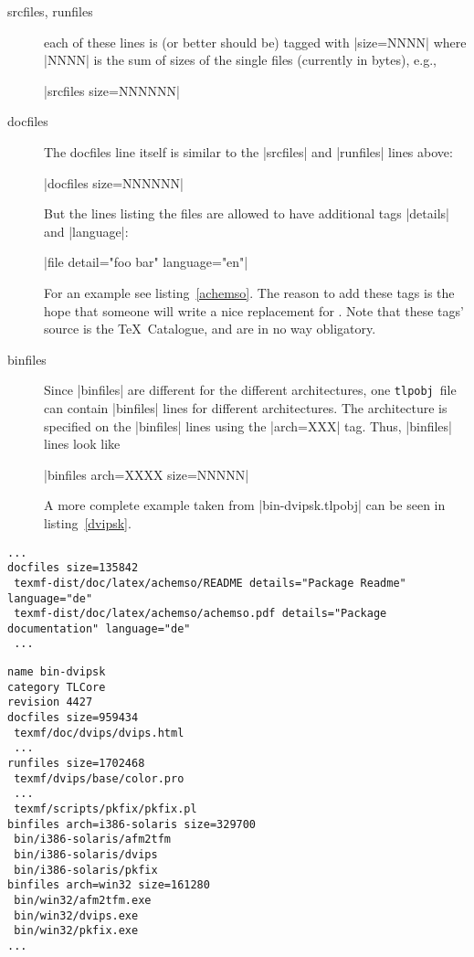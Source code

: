 \documentclass{arstexnica}
\newcommand{\tlpobj}{\texttt{tlpobj}}
\begin{document}
\begin{article}
\begin{description}
\item[srcfiles, runfiles] each of these lines is (or better should be)
  tagged with |size=NNNN| where |NNNN| is the sum of sizes of the single 
  files (currently in bytes), e.g.,
  \begin{center}
    |srcfiles size=NNNNNN|
  \end{center}
\item[docfiles] The docfiles line itself is similar to the |srcfiles|
  and |runfiles| lines above:
  \begin{center}
    |docfiles size=NNNNNN|
  \end{center}
  But the lines listing the files are allowed to have additional tags
  |details| and |language|:
  \begin{center}
    |file detail="foo bar" language="en"|
  \end{center}
  For an example see listing~\ref{achemso}. The reason to add these
  tags is the hope that someone will write a nice replacement for
  . Note that these tags' source is the \TeX\ Catalogue, 
  and are in no way obligatory.
\item[binfiles] Since |binfiles| are different for the different
  architectures, one \tlpobj\ file can contain |binfiles| lines for
  different architectures. The architecture is specified on the
  |binfiles| lines using the |arch=XXX| tag. Thus, |binfiles| lines look like
  \begin{center}
    |binfiles arch=XXXX size=NNNNN|
  \end{center}
  A more complete example taken from |bin-dvipsk.tlpobj| can be seen
  in listing~\ref{dvipsk}.
\end{description}

\begin{lstlisting}[caption={Excerpt from achemso.tlpobj},label=achemso]
...
docfiles size=135842
 texmf-dist/doc/latex/achemso/README details="Package Readme" language="de"
 texmf-dist/doc/latex/achemso/achemso.pdf details="Package documentation" language="de"
 ...
\end{lstlisting}

\begin{lstlisting}[caption={Excerpt from bin-dvipsk.tlpobj},label=dvipsk]
name bin-dvipsk
category TLCore
revision 4427
docfiles size=959434
 texmf/doc/dvips/dvips.html
 ...
runfiles size=1702468
 texmf/dvips/base/color.pro
 ...
 texmf/scripts/pkfix/pkfix.pl
binfiles arch=i386-solaris size=329700
 bin/i386-solaris/afm2tfm
 bin/i386-solaris/dvips
 bin/i386-solaris/pkfix
binfiles arch=win32 size=161280
 bin/win32/afm2tfm.exe
 bin/win32/dvips.exe
 bin/win32/pkfix.exe
...
\end{lstlisting}


\end{article}
\end{document}
